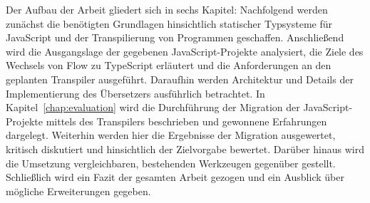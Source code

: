 Der Aufbau der Arbeit gliedert sich in sechs Kapitel: Nachfolgend werden zunächst die benötigten Grundlagen hinsichtlich statischer Typsysteme für JavaScript und der Transpilierung von Programmen geschaffen. Anschließend wird die Ausgangslage der gegebenen JavaScript-Projekte analysiert, die Ziele des Wechsels von Flow zu TypeScript erläutert und die Anforderungen an den geplanten Transpiler ausgeführt. Daraufhin werden Architektur und Details der Implementierung des Übersetzers ausführlich betrachtet. In Kapitel~\ref{chap:evaluation} wird die Durchführung der Migration der JavaScript-Projekte mittels des Transpilers beschrieben und gewonnene Erfahrungen dargelegt. Weiterhin werden hier die Ergebnisse der Migration ausgewertet, kritisch diskutiert und hinsichtlich der Zielvorgabe bewertet. Darüber hinaus wird die Umsetzung vergleichbaren, bestehenden Werkzeugen gegenüber gestellt. Schließlich wird ein Fazit der gesamten Arbeit gezogen und ein Ausblick über mögliche Erweiterungen gegeben.
